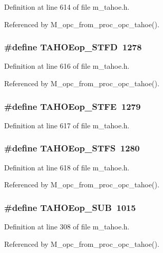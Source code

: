 Definition at line 614 of file m\_\-tahoe.h.

Referenced by M\_\-opc\_\-from\_\-proc\_\-opc\_\-tahoe().
\subsubsection{\setlength{\rightskip}{0pt plus 5cm}\#define TAHOEop\_\-STFD~1278}\label{m__tahoe_8h_ad3a3cb3eef279d1fa43258a85f50f26}




Definition at line 616 of file m\_\-tahoe.h.

Referenced by M\_\-opc\_\-from\_\-proc\_\-opc\_\-tahoe().
\subsubsection{\setlength{\rightskip}{0pt plus 5cm}\#define TAHOEop\_\-STFE~1279}\label{m__tahoe_8h_9610fdd089a8e3dc3f89ea65d7db3f2b}




Definition at line 617 of file m\_\-tahoe.h.
\subsubsection{\setlength{\rightskip}{0pt plus 5cm}\#define TAHOEop\_\-STFS~1280}\label{m__tahoe_8h_8deae1fa0ac5c65083b5670ae6f8ebed}




Definition at line 618 of file m\_\-tahoe.h.

Referenced by M\_\-opc\_\-from\_\-proc\_\-opc\_\-tahoe().
\subsubsection{\setlength{\rightskip}{0pt plus 5cm}\#define TAHOEop\_\-SUB~1015}\label{m__tahoe_8h_4e8989594313339814408c562870e8e4}




Definition at line 308 of file m\_\-tahoe.h.

Referenced by M\_\-opc\_\-from\_\-proc\_\-opc\_\-tahoe().
